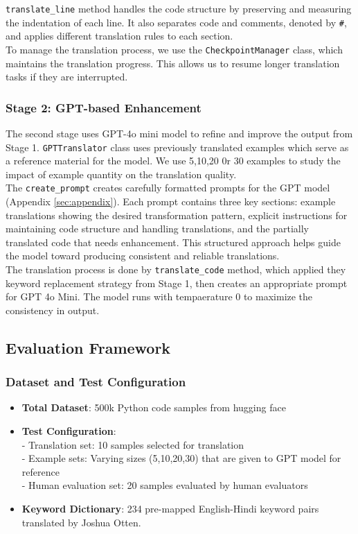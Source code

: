 \documentclass[11pt,a4paper]{article}
\begin{document}
\texttt{translate\_line} method handles the code structure by preserving and measuring the indentation of each line. It also separates code and comments, denoted by \texttt{\#}, and applies different translation rules to each section.\\

To manage the translation process, we use the \texttt{CheckpointManager} class, which maintains the translation progress. This allows us to resume longer translation tasks if they are interrupted.\\

\subsubsection{Stage 2: GPT-based Enhancement}
The second stage uses GPT-4o mini model \cite{gpt4omini} to refine and improve the output from Stage 1. \texttt{GPTTranslator} class uses previously translated examples which serve as a reference material for the model. We use 5,10,20 0r 30 examples to study the impact of example quantity on the translation quality.\\ 

The \texttt{create\_prompt} creates carefully formatted prompts for the GPT model (Appendix \ref{sec:appendix}). Each prompt contains three key sections: example translations showing the desired transformation pattern, explicit instructions for maintaining code structure and handling translations, and the partially translated code that needs enhancement. This structured approach helps guide the model toward producing consistent and reliable translations.\\ 

The translation process is done by \texttt{translate\_code} method, which applied they keyword replacement strategy from Stage 1, then creates an appropriate prompt for GPT 4o Mini. The model runs with tempaerature 0 to maximize the consistency in output.
\subsection{Evaluation Framework}
\subsubsection{Dataset and Test Configuration}
\begin{itemize}[itemsep=0pt, topsep=0pt]
    \item \textbf{Total Dataset}: 500k Python code samples from hugging face \cite{jtatman2021python}
    \item \textbf{Test Configuration}:\\ 
    - Translation set: 10 samples selected for translation\\
    - Example sets: Varying sizes (5,10,20,30) that are given to GPT model for reference\\ 
    - Human evaluation set: 20 samples evaluated by human evaluators
    \item \textbf{Keyword Dictionary}: 234 pre-mapped English-Hindi keyword pairs translated by Joshua Otten.
\end{itemize}
\end{document}
